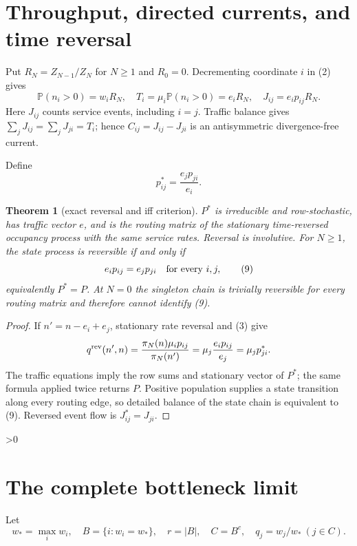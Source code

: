\documentclass[10pt]{article}
\providecommand{\CRevisionRound}{2}
\newtheorem{theorem}{Theorem}
\newcommand{\Pp}{\mathbb P}
\begin{document}
\section{Throughput, directed currents, and time reversal}
Put $R_N=Z_{N-1}/Z_N$ for $N\geq1$ and $R_0=0$.  Decrementing coordinate
$i$ in (2) gives
\begin{equation}
 \Pp(n_i>0)=w_iR_N,\quad
 T_i=\mu_i\Pp(n_i>0)=e_iR_N,\quad
 J_{ij}=e_ip_{ij}R_N.                                    \tag{7}
\end{equation}
Here $J_{ij}$ counts service events, including $i=j$.  Traffic balance gives
$\sum_jJ_{ij}=\sum_jJ_{ji}=T_i$; hence
$C_{ij}=J_{ij}-J_{ji}$ is an antisymmetric divergence-free current.

Define
\begin{equation}
 p^*_{ij}=\frac{e_jp_{ji}}{e_i}.                          \tag{8}
\end{equation}

\begin{theorem}[exact reversal and iff criterion]\label{thm:reverse}
$P^*$ is irreducible and row-stochastic, has traffic vector $e$, and is the
routing matrix of the stationary time-reversed occupancy process with the
same service rates.  Reversal is involutive.  For $N\geq1$, the state process
is reversible if and only if
\begin{equation}
 e_ip_{ij}=e_jp_{ji}\quad\hbox{for every }i,j,             \tag{9}
\end{equation}
equivalently $P^*=P$.  At $N=0$ the singleton chain is trivially reversible
for every routing matrix and therefore cannot identify (9).
\end{theorem}

\begin{proof}
If $n'=n-e_i+e_j$, stationary rate reversal and (3) give
\[
 q^{\rm rev}(n',n)=\frac{\pi_N(n)\mu_ip_{ij}}{\pi_N(n')}
 =\mu_j\frac{e_ip_{ij}}{e_j}=\mu_jp^*_{ji}.
\]
The traffic equations imply the row sums and stationary vector of $P^*$;
the same formula applied twice returns $P$.  Positive population supplies a
state transition along every routing edge, so detailed balance of the state
chain is equivalent to (9).  Reversed event flow is $J^*_{ij}=J_{ji}$.
\end{proof}

\ifnum\CRevisionRound>0
\section{The complete bottleneck limit}
Let
\[
 w_*=\max_iw_i,\quad B=\{i:w_i=w_*\},\quad r=|B|,
 \quad C=B^c,\quad q_j=w_j/w_*\ (j\in C).                \tag{10}
\]
\end{document}
